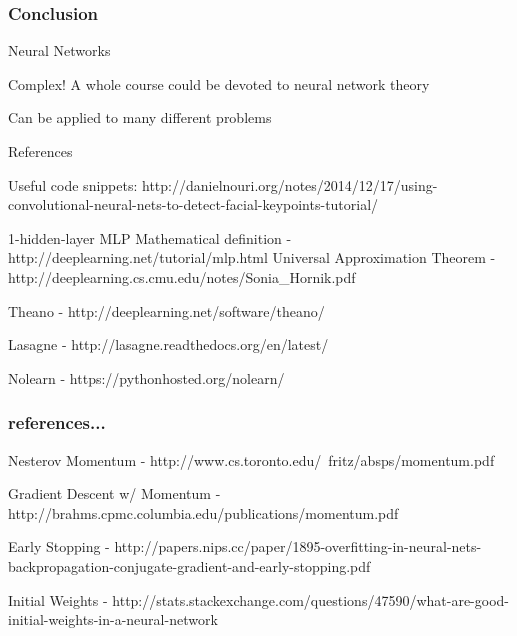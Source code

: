 \documentclass{beamer}
\begin{document}
\begin{frame}[fragile]
\frametitle{Conclusion}
\begin{block}{Neural Networks}
\item Complex! A whole course could be devoted to neural network theory
\item Can be applied to many different problems
\end{block}
\end{frame}

\begin{frame}{References}
\begin{block}{ }
\item Useful code snippets: http://danielnouri.org/notes/2014/12/17/using-convolutional-neural-nets-to-detect-facial-keypoints-tutorial/
\item 1-hidden-layer MLP Mathematical definition - http://deeplearning.net/tutorial/mlp.html
Universal Approximation Theorem - http://deeplearning.cs.cmu.edu/notes/Sonia_Hornik.pdf

\item Theano - http://deeplearning.net/software/theano/
\item Lasagne - http://lasagne.readthedocs.org/en/latest/
\item Nolearn - https://pythonhosted.org/nolearn/

\end{block}
\end{frame}


\begin{frame}
\frametitle{references...}
\begin{block}{ }
\item Nesterov Momentum - http://www.cs.toronto.edu/~fritz/absps/momentum.pdf
\item Gradient Descent w/ Momentum - http://brahms.cpmc.columbia.edu/publications/momentum.pdf
\item Early Stopping - http://papers.nips.cc/paper/1895-overfitting-in-neural-nets-backpropagation-conjugate-gradient-and-early-stopping.pdf
\item Initial Weights - http://stats.stackexchange.com/questions/47590/what-are-good-initial-weights-in-a-neural-network
\end{block}
\end{frame}
\end{document}
